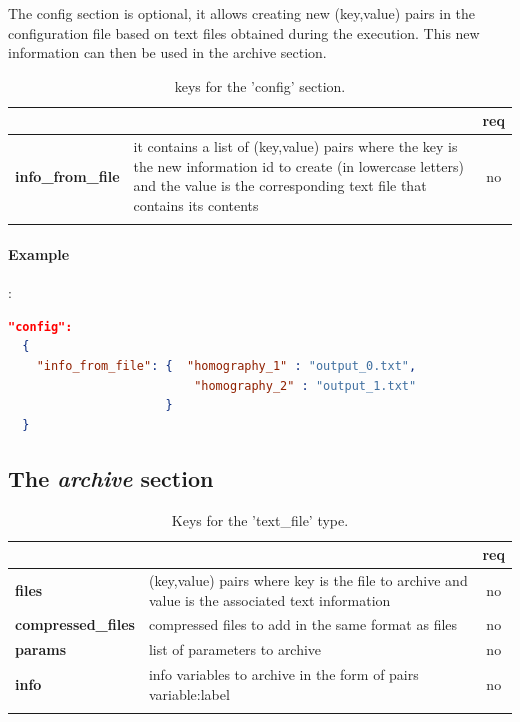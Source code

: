 The config section is optional, it allows creating new (key,value) pairs in the 
configuration file based on text files obtained during the execution. This 
new information can then be used in the archive section.

\begin{longtable}{|>{\bf}L{\linewidth}|L{\linewidth}|c|}
\hline
{}     &  & {\bf req} \tabularnewline 
\hline \hline
 info\_from\_file    & it contains a list of (key,value) pairs where the key is
            the new information id to create (in lowercase letters) and the
            value is the corresponding text file that contains its contents & no \\ \hline
\caption{keys for the 'config' section.}
\end{longtable}

\paragraph{Example}:\\
\begin{lstlisting}[language=json,firstnumber=1]
"config":
  {
    "info_from_file": {  "homography_1" : "output_0.txt",
                          "homography_2" : "output_1.txt"
                      }
  }
\end{lstlisting}

\subsection{The \emph{archive} section}


\begin{longtable}{|>{\bf}L{\linewidth}|L{\linewidth}|c|}
\hline
{}     &  & {\bf req} \tabularnewline 
\hline \hline
 files    & (key,value) pairs where key is the file to archive and value is 
            the associated text information & no \\ \hline
 compressed\_\-files   & compressed files to add in the same format 
as files & no \\ \hline
 params  & list of parameters to archive & no \\ \hline
 info    & info variables to archive in the form of pairs variable:label & no \\ \hline
\caption{Keys for the 'text\_file' type.}
\end{longtable}



